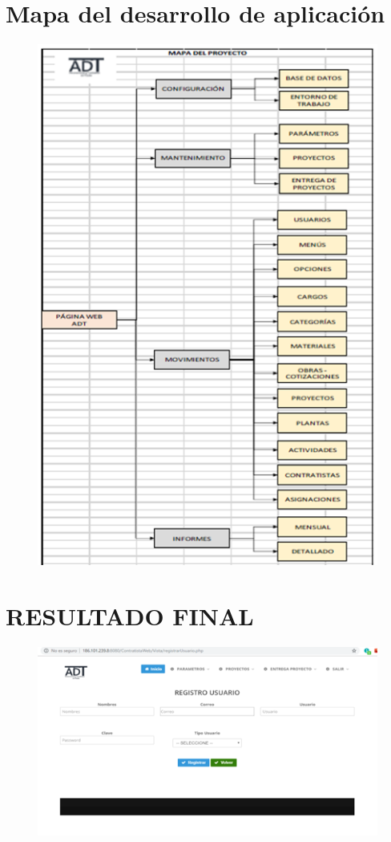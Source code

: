 \documentclass[12pt,a4paper]{article}
\begin{document}
\section*{Mapa del desarrollo de aplicación}
\begin{figure}[hbtp]
\caption{}
\centering
\includegraphics[scale=0.5]{DECIMOTERCERA.png}
\end{figure}



\section*{RESULTADO FINAL}
\begin{figure}[hbtp]
\caption{}
\centering
\includegraphics[scale=0.5]{DECIMOCUARTA.png}
\end{figure}
\end{document}
